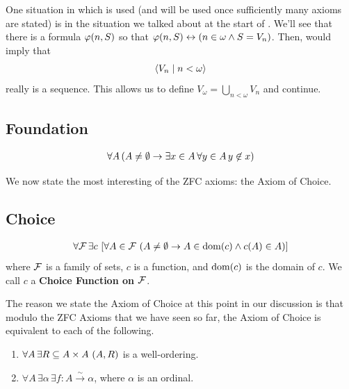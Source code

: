 One situation in which  is used (and will be used once sufficiently many axioms are stated) is in the situation we talked about at the start of . We'll see that there is a formula $\varphi\!\left( n, S \right)$ so that $\varphi\!\left( n, S \right) \leftrightarrow \left( n \in \omega \land S = V_n \right)$. Then,  would imply that
\begin{align*}
    \left\langle V_n \; \middle| \; n < \omega \right\rangle
\end{align*}
really is a sequence. This allows us to define $V_\omega = \bigcup_{n < \omega} V_n$ and continue.

\subsection{Foundation}

\begin{baxiom}
    \begin{align*}
        \forall A \left( A \ne \emptyset \to \exists x \in A \, \forall y \in A \, y \not\in x \right)
    \end{align*}
\end{baxiom}

We now state the most interesting of the ZFC axioms: the Axiom of Choice.

\subsection{Choice}

\begin{baxiom}\label{ZFC:AC}
    \hfill
    \begin{align*}
        \forall \mathcal{F} \, \exists c \, \left[ \forall A \in \mathcal{F} \, \left( A \neq \emptyset \to A \in \operatorname{dom}\!\left( c \right) \land c(A) \in A \right) \right]
    \end{align*}
    where $\mathcal{F}$ is a family of sets, $c$ is a function, and $\operatorname{dom}\!\left( c \right)$ is the domain of $c$. We call $c$ a \textbf{Choice Function on $\mathcal{F}$}.
\end{baxiom}

The reason we state the Axiom of Choice at this point in our discussion is that modulo the ZFC Axioms that we have seen so far, the Axiom of Choice is equivalent to each of the following.
\begin{enumerate}
    \item $\forall A \, \exists R \subseteq A \times A \, \left( A, R \right)$ is a well-ordering.
    \item $\forall A \, \exists \alpha \, \exists f : A \xrightarrow{\sim} \alpha$, where $\alpha$ is an ordinal.
\end{enumerate}

